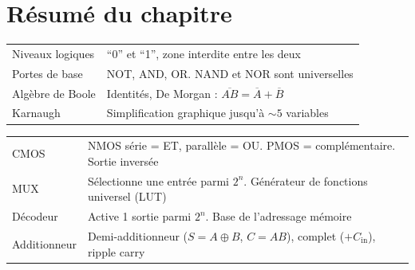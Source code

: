 \documentclass[12pt,a4paper,twoside]{book}
\begin{document}
\section*{Résumé du chapitre}

\begin{bases}[title={\color{white} Résumé --- Les Bases}]
\begin{center}
\renewcommand{\arraystretch}{1.3}
\begin{tabular}{p{3.5cm}p{9.5cm}}
\toprule
Niveaux logiques & ``0'' et ``1'', zone interdite entre les deux \\
Portes de base & NOT, AND, OR. NAND et NOR sont universelles \\
Algèbre de Boole & Identités, De Morgan : $\overline{AB} = \overline{A}+\overline{B}$ \\
Karnaugh & Simplification graphique jusqu'à $\sim 5$ variables \\
\bottomrule
\end{tabular}
\end{center}
\end{bases}

\begin{approfondissement}[title={\color{white} Résumé --- Approfondissement}]
\begin{center}
\renewcommand{\arraystretch}{1.3}
\begin{tabular}{p{3.5cm}p{9.5cm}}
\toprule
CMOS & NMOS série = ET, parallèle = OU. PMOS = complémentaire. Sortie inversée \\
MUX & Sélectionne une entrée parmi $2^n$. Générateur de fonctions universel (LUT) \\
Décodeur & Active 1 sortie parmi $2^n$. Base de l'adressage mémoire \\
Additionneur & Demi-additionneur ($S = A\oplus B$, $C = AB$), complet ($+C_{\text{in}}$), ripple carry \\
\bottomrule
\end{tabular}
\end{center}
\end{approfondissement}
\end{document}
